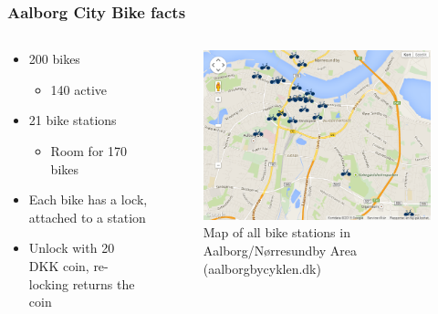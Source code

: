 \begin{frame}
\frametitle{Aalborg City Bike facts}
\begin{columns}
\begin{column}{.5\textwidth}
\begin{itemize}
\item 200 bikes
\begin{itemize}
\item 140 active
\end{itemize}
\item 21 bike stations
\begin{itemize}
\item Room for 170 bikes
\end{itemize}
\item Each bike has a lock, attached to a station
\item Unlock with 20 DKK coin, re-locking returns the coin
\end{itemize}
\end{column}
\begin{column}{.5\textwidth}
\begin{figure}
\includegraphics[width=\textwidth]{graphics/acb_gmaps}
\caption{Map of all bike stations in Aalborg/Nørresundby Area (aalborgbycyklen.dk)}
\end{figure}
\end{column}
\end{columns}
\end{frame}

